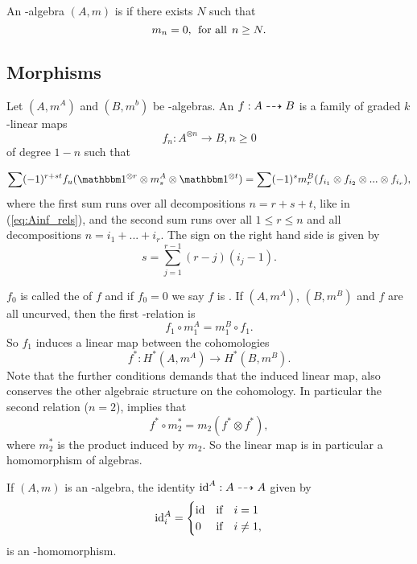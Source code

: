 
\begin{defn}
An \Ainf-algebra $(A,m)$ is  if there exists $N$ such that
\[ m_n = 0, \:\:\text{for all}\:\: n\ge N.  \]
\end{defn}

\subsection{Morphisms}

\begin{defn}
Let $(A,m^A)$ and $(B,m^b)$ be \Ainf-algebras. An  
$f:A \dashrightarrow B$ is a family of graded $k$-linear maps
\[ f_n : A^{\otimes n} \to B, n\ge 0 \]
of degree $1-n$ such that

\begin{equation}
\label{eq:ainf_morph_rel}
\sum (-1)^{r+st} f_u(\I^{\otimes r} \otimes m^A_s \otimes \I^{\otimes t}) 
= \sum (-1)^s m^B_r (f_{i_1} \otimes f_{i_2} \otimes ... \otimes
f_{i_r}),
\end{equation}
where the first sum runs over all decompositions $n = r+s+t$, like in
(\ref{eq:Ainf_rels}), and the second sum runs over all $1 \le r \le n$ and all
decompositions $n = i_1 + ... + i_r$. The sign on the right hand side is given
by
\[s = \sum_{j=1}^{r-1} (r-j)(i_j-1).  \]
\end{defn}

$f_0$ is called the  of $f$ and if $f_0 = 0$ we say $f$ is
.
If $(A,m^A)$, $(B,m^B)$ and $f$ are all uncurved, then the first \Ainf-relation is 
\[ f_1 \circ m^A_1 = m^B_1 \circ f_1. \]
So $f_1$ induces a linear map between the cohomologies
\[ f^* : H^*(A, m^A) \to H^*(B,m^B). \]
Note that the further conditions demands that the induced linear map, also
conserves the other algebraic structure on the cohomology. In particular the
second relation ($n=2$), implies that 
\[ f^* \circ m_2^* = m_2(f^* \otimes f^*), \]
where $m_2^*$ is the product induced by $m_2$. So the linear map is in
particular a homomorphism of algebras.

\begin{exmp}
If $(A, m)$ is an \Ainf-algebra, the identity $\operatorname{id}^A : A \dashrightarrow A$ given by
\[ \operatorname{id}^A_i = \begin{cases}  \operatorname{id} &\text{if}\quad i = 1 \\ 0 &\text{if}\quad i \ne 1,  \end{cases} \]
is an \Ainf-homomorphism.
\end{exmp}

